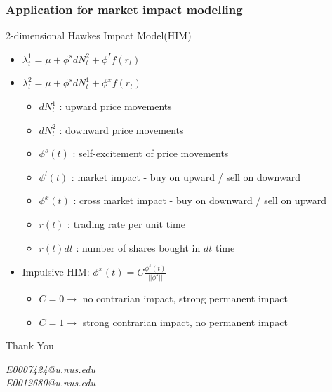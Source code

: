 \documentclass{beamer}
\begin{document}
\begin{frame}
\frametitle{Application for market impact modelling}
2-dimensional Hawkes Impact Model(HIM)
\begin{itemize}
	\item $\lambda_t^1 = \mu + \phi^s dN_t^2 + \phi^I f(r_t)$
	\item $\lambda_t^2 = \mu + \phi^s dN_t^1 + \phi^x f(r_t)$
	\begin{itemize}
		\item $dN_t^1$ : upward price movements
		\item $dN_t^2$ : downward price movements
		\item $\phi^s(t)$ : self-excitement of price movements
		\item $\phi^l(t)$ : market impact - buy on upward / sell on downward
		\item $\phi^x(t)$ : cross market impact - buy on downward / sell on upward
		\item $r(t)$ : trading rate per unit time
		\item $r(t)dt$ : number of shares bought in $dt$ time
	\end{itemize}
	\item Impulsive-HIM: $\phi^x(t) = C\frac{\phi^s(t)}{|| \phi^s||}$
	\begin{itemize}
		\item $C = 0 \to$ no contrarian impact, strong permanent impact
		\item $C = 1 \to$ strong contrarian impact, no permanent impact
	\end{itemize}
\end{itemize}
\end{frame}

\begin{frame}
\Huge{\centerline{Thank You}}
\begin{center}
\end{center}
\begin{center}
\begin{normalsize}
\emph{E0007424@u.nus.edu}\\
\emph{E0012680@u.nus.edu}
\end{normalsize}
\end{center}
\end{frame}


\end{document}
